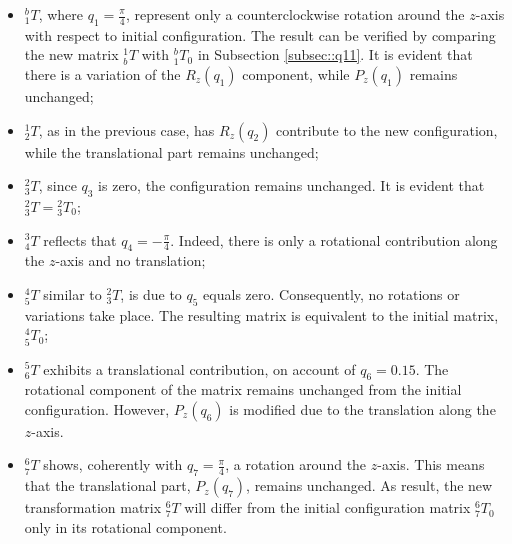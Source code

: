 \begin{itemize}
	\item $^b_1 T$, where $q_1 = \frac{\pi}{4}$, represent only a counterclockwise rotation around the $z$-axis with respect to initial configuration. The result can be verified by comparing the new matrix $^1_b T$ with $^b_1 T_{0}$ in Subsection \ref{subsec::q11}. It is evident that there is a variation of the $R_{z}(q_1)$ component, while $P_{z}(q_1)$ remains unchanged;
	\item $^1_2 T$, as in the previous case, has $R_{z}(q_2)$ contribute to the new configuration, while the translational part remains unchanged;
	\item $^2_3 T$, since $q_3$ is zero, the configuration remains unchanged. It is evident that $^2_3 T = {}^2_3 T_{0}$; 
	\item $^3_4 T$ reflects that $q_4 = -\frac{\pi}{4}$. Indeed, there is only a rotational contribution along the $z$-axis and no translation;
	\item $^4_5 T$ similar to $^2_3 T$, is due to $q_5$ equals zero. Consequently, no rotations or variations take place. The resulting matrix is equivalent to the initial matrix, $^4_5 T_{0}$;
	\item $^5_6 T$ exhibits a translational contribution, on account of $q_6 = 0.15$. The rotational component of the matrix remains unchanged from the initial configuration. However, $P_{z}(q_6)$ is modified due to the translation along the $z$-axis.
	\item $^6_7 T$ shows, coherently with $q_7 = \frac{\pi}{4}$, a rotation around the $z$-axis. This means that the translational part, $P_{z}(q_7)$, remains unchanged. As result, the new transformation matrix $^6_7 T$ will differ from the initial configuration matrix $^6_7 T_{0}$ only in its rotational component.
\end{itemize}


